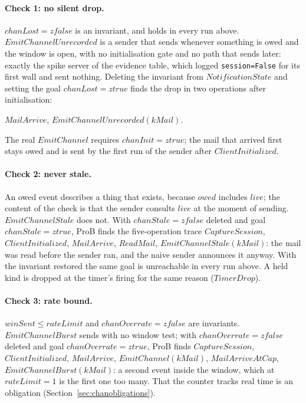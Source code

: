 \documentclass[a4paper,10pt,fleqn]{article}
\begin{document}
\paragraph{Check 1: no silent drop.}  $chanLost = zfalse$ is an invariant,
and holds in every run above.  $EmitChannelUnrecorded$ is a sender that sends
whenever something is owed and the window is open, with no initialisation
gate and no path that sends later: exactly the spike server of the evidence
table, which logged \texttt{session=False} for its first wall and sent
nothing.  Deleting the invariant from $NotificationState$ and setting the
goal $chanLost = ztrue$ finds the drop in two operations after
initialisation:
\begin{center}
$MailArrive$, $EmitChannelUnrecorded(kMail)$.
\end{center}
The real $EmitChannel$ requires $chanInit = ztrue$; the mail that arrived
first stays owed and is sent by the first run of the sender after
$ClientInitialized$.

\paragraph{Check 2: never stale.}  An owed event describes a thing that
exists, because $owed$ includes $live$; the content of the check is that the
sender consults $live$ at the moment of sending.  $EmitChannelStale$ does
not.  With $chanStale = zfalse$ deleted and goal $chanStale = ztrue$, ProB
finds the five-operation trace $CaptureSession$, $ClientInitialized$,
$MailArrive$, $ReadMail$, $EmitChannelStale(kMail)$: the mail was read
before the sender ran, and the naive sender announces it anyway.  With the
invariant restored the same goal is unreachable in every run above.  A held
kind is dropped at the timer's firing for the same reason ($TimerDrop$).

\paragraph{Check 3: rate bound.}  $winSent \leq rateLimit$ and
$chanOverrate = zfalse$ are invariants.  $EmitChannelBurst$ sends with no
window test; with $chanOverrate = zfalse$ deleted and goal $chanOverrate =
ztrue$, ProB finds $CaptureSession$, $ClientInitialized$, $MailArrive$,
$EmitChannel(kMail)$, $MailArriveAtCap$, $EmitChannelBurst(kMail)$: a second
event inside the window, which at $rateLimit = 1$ is the first one too many.
That the counter tracks real time is an obligation
(Section~\ref{sec:chanobligations}).
\end{document}
